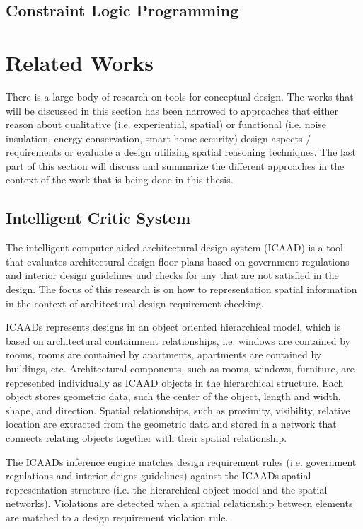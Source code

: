 \documentclass[12pt]{ucthesis}
\begin{document}
\subsection{Constraint Logic Programming}


\section{Related Works}
\label{related works}
There is a large body of research on tools for conceptual design. The works that will be discussed in this section has been narrowed to approaches that either reason about qualitative (i.e. experiential, spatial) or functional (i.e. noise insulation, energy conservation, smart home security) design aspects / requirements or evaluate a design utilizing spatial reasoning techniques. The last part of this section will discuss and summarize the different approaches in the context of the work that is being done in this thesis.


\subsection{Intelligent Critic System}
The intelligent computer-aided architectural design system (ICAAD) \cite{IntelligentCritic} is a tool that evaluates architectural design floor plans based on government regulations and interior design guidelines and checks for any that are not satisfied in the design. The focus of this research is on how to representation spatial information in the context of architectural design requirement checking.

ICAADs represents designs in an object oriented hierarchical model, which is based on architectural containment relationships, i.e. windows are contained by rooms, rooms are contained by apartments, apartments are contained by buildings, etc. Architectural components, such as rooms, windows, furniture, are represented individually as ICAAD objects in the hierarchical structure. Each object stores geometric data, such the center of the object, length and width, shape, and direction. Spatial relationships, such as proximity, visibility, relative location are extracted from the geometric data and stored in a network that connects relating objects together with their spatial relationship. 

The ICAADs inference engine matches design requirement rules (i.e. government regulations and interior deigns guidelines) against the ICAADs spatial representation structure (i.e. the hierarchical object model and the spatial networks). Violations are detected when a spatial relationship between elements are matched to a design requirement violation rule.  
\end{document}

